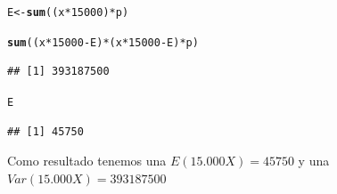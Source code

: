\documentclass{article}\usepackage[]{graphicx}\usepackage[]{color}
\makeatletter
\newcommand{\hlnum}[1]{\textcolor[rgb]{0.686,0.059,0.569}{#1}}%
\newcommand{\hlopt}[1]{\textcolor[rgb]{0,0,0}{#1}}%
\newcommand{\hlstd}[1]{\textcolor[rgb]{0.345,0.345,0.345}{#1}}%
\newcommand{\hlkwb}[1]{\textcolor[rgb]{0.69,0.353,0.396}{#1}}%
\newcommand{\hlkwd}[1]{\textcolor[rgb]{0.737,0.353,0.396}{\textbf{#1}}}%
\newenvironment{kframe}{%
 \def\at@end@of@kframe{}%
 \ifinner\ifhmode%
  \def\at@end@of@kframe{\end{minipage}}%
  \begin{minipage}{\columnwidth}%
 \fi\fi%
 \def\FrameCommand##1{\hskip\@totalleftmargin \hskip-\fboxsep
 \colorbox{shadecolor}{##1}\hskip-\fboxsep
     \hskip-\linewidth \hskip-\@totalleftmargin \hskip\columnwidth}%
 \MakeFramed {\advance\hsize-\width
   \@totalleftmargin\z@ \linewidth\hsize
   \@setminipage}}%
 {\par\unskip\endMakeFramed%
 \at@end@of@kframe}
\newenvironment{knitrout}{}{} %
\makeatother
\begin{document}
\begin{enumerate}
\begin{knitrout}
\begin{kframe}
\begin{alltt}
\hlstd{E} \hlkwb{<-} \hlkwd{sum}\hlstd{((x}\hlopt{*}\hlnum{15000}\hlstd{)}\hlopt{*}\hlstd{p)}

\hlkwd{sum}\hlstd{((x}\hlopt{*}\hlnum{15000}\hlopt{-}\hlstd{E)}\hlopt{*}\hlstd{(x}\hlopt{*}\hlnum{15000}\hlopt{-}\hlstd{E)}\hlopt{*}\hlstd{p)}
\end{alltt}
\begin{verbatim}
## [1] 393187500
\end{verbatim}
\begin{alltt}
\hlstd{E}
\end{alltt}
\begin{verbatim}
## [1] 45750
\end{verbatim}
\end{kframe}
\end{knitrout}

Como resultado tenemos una $E(15.000X)= 45750$ y una $Var(15.000X)= 393187500$

\end{enumerate}
\end{document}
